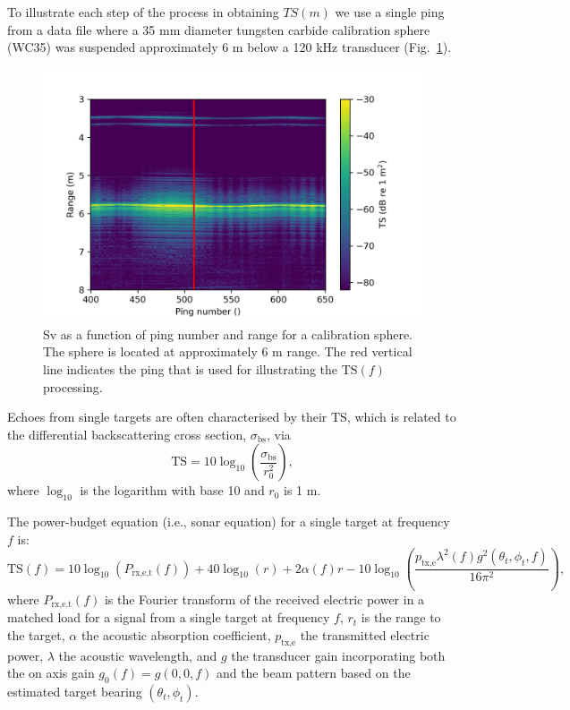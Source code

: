 \documentclass[preprint,12pt,TurnOnLineNumbers]{JASAnew}
\newcommand{\freqsym}{f}
\newcommand{\ptxe}{p_{\textrm{tx,e}}}
\newcommand{\prxetf}{P_{\textrm{rx,e,t}}}
\newcommand{\bs}{\sigma_{\textrm{bs}}}
\newcommand{\ts}{\textrm{TS}}
\newcommand{\range}{r}
\newcommand{\rangeref}{r_0}
\newcommand{\athw}{\phi}
\newcommand{\along}{\theta}
\newcommand{\gain}{g}
\newcommand{\wlen}{\lambda}
\newcommand{\absorp}{\alpha}
\begin{document}
To illustrate each step of the process in obtaining $TS(m)$ we use a single ping from a data file where a 35 mm diameter tungsten carbide calibration sphere (WC35) was suspended approximately 6 m below a 120 kHz transducer (Fig.~\ref{Fig_TS_echogram}). 

\begin{figure}
\includegraphics[width=16cm]{Fig_TS_echogram}
\caption{\label{Fig_TS_echogram} Sv as a function of ping number and range for a calibration sphere. The sphere is located at approximately 6 m range. The red vertical line indicates the ping that is used for illustrating the $\ts(\freqsym)$ processing.}
\end{figure}

Echoes from single targets are often characterised by their $\ts$, which is related to the differential backscattering cross section, $\bs$, via
%
\begin{equation}
\label{eq:TS_bs}
\ts = 10\log_{10}\left(\frac{\bs}{\rangeref^2}\right),
\end{equation}
%
where $\log_{10}$ is the logarithm with base 10 and $\rangeref$ is 1 m.

The power-budget equation (i.e., sonar equation) for a single target \citep[Formulation D, ][]{lunde2016} at frequency $\freqsym$ is:
%
\begin{equation}
\label{eq:TS}
\ts(\freqsym) = 10\log_{10}(\prxetf(\freqsym)) + 40\log_{10}(\range) + 2\absorp(\freqsym) \range 
- 10\log_{10}\left( \frac{\ptxe \wlen^2(\freqsym) \gain^2(\along_t,\athw_t,\freqsym)}{16\pi^2} \right),
\end{equation}
%
where $\prxetf(\freqsym)$ is the Fourier transform of the received electric power in a matched load for a signal from a single target at frequency $\freqsym$, $\range_t$ is the range to the target, $\absorp$ the acoustic absorption coefficient, $\ptxe$ the transmitted electric power, $\wlen$ the acoustic wavelength, and $\gain$ the transducer gain incorporating both the on axis gain $\gain_0(\freqsym)=\gain(0,0,\freqsym)$ and the beam pattern based on the estimated target bearing $(\along_t,\athw_t)$.
\end{document}
